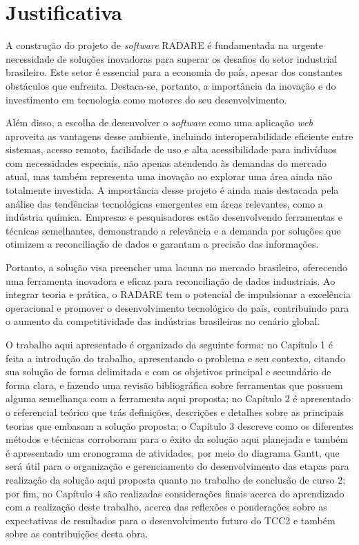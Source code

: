 \section{Justificativa}

A construção do projeto de \textit{software} RADARE é fundamentada na urgente necessidade de soluções inovadoras para superar os desafios do setor industrial brasileiro. Este setor é essencial para a economia do país, apesar dos constantes obstáculos que enfrenta. Destaca-se, portanto, a importância da inovação e do investimento em tecnologia como motores do seu desenvolvimento.

Além disso, a escolha de desenvolver o \textit{software} como uma aplicação \textit{web} aproveita as vantagens desse ambiente, incluindo interoperabilidade eficiente entre sistemas, acesso remoto, facilidade de uso e alta acessibilidade para indivíduos com necessidades especiais, não apenas atendendo às demandas do mercado atual, mas também representa uma inovação ao explorar uma área ainda não totalmente investida. A importância desse projeto é ainda mais destacada pela análise das tendências tecnológicas emergentes em áreas relevantes, como a indústria química. Empresas e pesquisadores estão desenvolvendo ferramentas e técnicas semelhantes, demonstrando a relevância e a demanda por soluções que otimizem a reconciliação de dados e garantam a precisão das informações.

Portanto, a solução visa preencher uma lacuna no mercado brasileiro, oferecendo uma ferramenta inovadora e eficaz para reconciliação de dados industriais. Ao integrar teoria e prática, o RADARE tem o potencial de impulsionar a excelência operacional e promover o desenvolvimento tecnológico do país, contribuindo para o aumento da competitividade das indústrias brasileiras no cenário global.

O trabalho aqui apresentado é organizado da seguinte forma: no Capítulo 1 é feita a introdução do trabalho, apresentando o problema e seu contexto, citando sua solução de forma delimitada e com os objetivos principal e secundário de forma clara, e fazendo uma revisão bibliográfica sobre ferramentas que possuem alguma semelhança com a ferramenta aqui proposta; no Capítulo 2 é apresentado o referencial teórico que trás definições, descrições e detalhes sobre as principais teorias que embasam a solução proposta; o Capítulo 3 descreve como os diferentes métodos e técnicas corroboram para o êxito da solução aqui planejada e também é apresentado um cronograma de atividades, por meio do diagrama Gantt, que será útil para o organização e gerenciamento do desenvolvimento das etapas para realização da solução aqui proposta quanto no trabalho de conclusão de curso 2; por fim, no Capítulo 4 são realizadas considerações finais acerca do aprendizado com a realização deste trabalho, acerca das reflexões e ponderações sobre as expectativas de resultados para o desenvolvimento futuro do TCC2 e também sobre as contribuições desta obra.